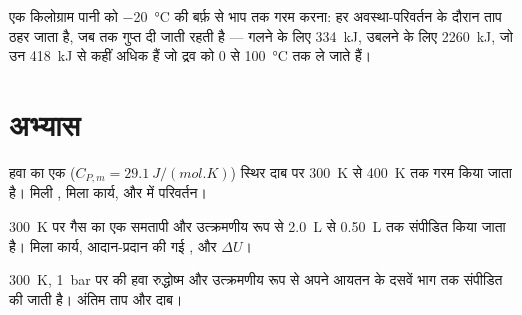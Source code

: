 \begin{omfigure}

{\small एक किलोग्राम पानी को \qty{-20}{\degreeCelsius} की बर्फ़ से भाप तक
गरम करना: हर अवस्था-परिवर्तन के दौरान ताप ठहर जाता है, जब तक गुप्त 
दी जाती रहती है --- गलने के लिए \qty{334}{kJ}, उबलने के लिए \qty{2260}{kJ},
जो उन \qty{418}{kJ} से कहीं अधिक हैं जो द्रव को \qty{0}{} से
\qty{100}{\degreeCelsius} तक ले जाते हैं।}
\end{omfigure}

\section{अभ्यास}

\begin{exercise}[$\star$]\label{exo:b1:first-law:1}
हवा का एक  ($C_{P,m} = \qty{29.1}{J/(mol.K)}$) स्थिर दाब पर
\qty{300}{K} से \qty{400}{K} तक गरम किया जाता है। मिली , मिला कार्य,
और  में परिवर्तन।
\end{exercise}

\begin{exercise}[$\star$]\label{exo:b1:first-law:2}
\qty{300}{K} पर गैस का एक  समतापी और उत्क्रमणीय रूप से \qty{2.0}{L} से
\qty{0.50}{L} तक संपीडित किया जाता है। मिला कार्य, आदान-प्रदान की गई
, और $\Delta U$।
\end{exercise}

\begin{exercise}[$\star$]\label{exo:b1:first-law:3}
\qty{300}{K}, \qty{1}{bar} पर की हवा रुद्धोष्म और उत्क्रमणीय रूप से अपने
आयतन के दसवें भाग तक संपीडित की जाती है। अंतिम ताप और दाब।
\end{exercise}

